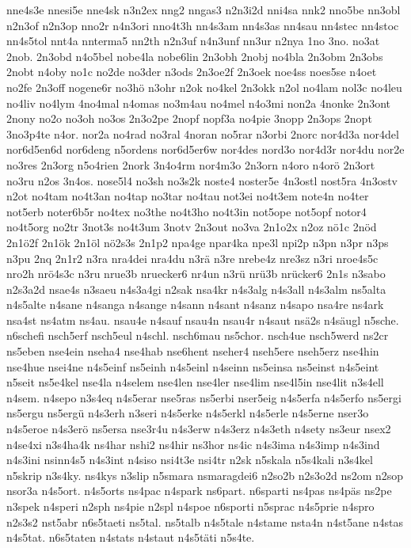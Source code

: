 {nne4s3e
nnesi5e
nne4sk
n3n2ex
nng2
nngas3
n2n3i2d
nni4sa
nnk2
nno5be
nn3obl
n2n3of
n2n3op
nno2r
n4n3ori
nno4t3h
nn4s3am
nn4s3as
nn4sau
nn4stec
nn4stoc
nn4s5tol
nnt4a
nnterma5
nn2th
n2n3uf
n4n3unf
nn3ur
n2nya
1no
3no.
no3at
2nob.
2n3obd
n4o5bel
nobe4la
nobe6lin
2n3obh
2nobj
no4bla
2n3obm
2n3obs
2nobt
n4oby
no1c
no2de
no3der
n3ods
2n3oe2f
2n3oek
noe4ss
noes5se
n4oet
no2fe
2n3off
nogene6r
no3hö
n3ohr
n2ok
no4kel
2n3okk
n2ol
no4lam
nol3c
no4leu
no4liv
no4lym
4no4mal
n4omas
no3m4au
no4mel
n4o3mi
non2a
4nonke
2n3ont
2nony
no2o
no3oh
no3os
2n3o2pe
2nopf
nopf3a
no4pie
3nopp
2n3ops
2nopt
3no3p4te
n4or.
nor2a
no4rad
no3ral
4noran
no5rar
n3orbi
2norc
nor4d3a
nor4del
nor6d5en6d
nor6deng
n5ordens
nor6d5er6w
nor4des
nord3o
nor4d3r
nor4du
nor2e
no3res
2n3org
n5o4rien
2nork
3n4o4rm
nor4m3o
2n3orn
n4oro
n4orö
2n3ort
no3ru
n2os
3n4os.
nose5l4
no3sh
no3s2k
noste4
noster5e
4n3ostl
nost5ra
4n3ostv
n2ot
no4tam
no4t3an
no4tap
no3tar
no4tau
not3ei
no4t3em
note4n
no4ter
not5erb
noter6b5r
no4tex
no3the
no4t3ho
no4t3in
not5ope
not5opf
notor4
no4t5org
no2tr
3not3s
no4t3um
3notv
2n3out
no3va
2n1o2x
n2oz
nö1c
2nöd
2n1ö2f
2n1ök
2n1öl
nö2s3s
2n1p2
npa4ge
npar4ka
npe3l
npi2p
n3pn
n3pr
n3ps
n3pu
2nq
2n1r2
n3ra
nra4dei
nra4du
n3rä
n3re
nrebe4z
nre3sz
n3ri
nroe4s5c
nro2h
nrö4s3c
n3ru
nrue3b
nruecker6
nr4un
n3rü
nrü3b
nrücker6
2n1s
n3sabo
n2s3a2d
nsae4s
n3saeu
n4s3a4gi
n2sak
nsa4kr
n4s3alg
n4s3all
n4s3alm
ns5alta
n4s5alte
n4sane
n4sanga
n4sange
n4sann
n4sant
n4sanz
n4sapo
nsa4re
ns4ark
nsa4st
ns4atm
ns4au.
nsau4e
n4sauf
nsau4n
nsau4r
n4saut
nsä2s
n4säugl
n5sche.
n6schefi
nsch5erf
nsch5eul
n4schl.
nsch6mau
ns5chor.
nsch4ue
nsch5werd
ns2cr
ns5eben
nse4ein
nseha4
nse4hab
nse6hent
nseher4
nseh5ere
nseh5erz
nse4hin
nse4hue
nsei4ne
n4s5einf
ns5einh
n4s5einl
n4seinn
ns5einsa
ns5einst
n4s5eint
n5seit
ns5e4kel
nse4la
n4selem
nse4len
nse4ler
nse4lim
nse4l5in
nse4lit
n3s4ell
n4sem.
n4sepo
n3s4eq
n4s5erar
nse5ras
ns5erbi
nser5eig
n4s5erfa
n4s5erfo
ns5ergi
ns5ergu
ns5ergü
n4s3erh
n3seri
n4s5erke
n4s5erkl
n4s5erle
n4s5erne
nser3o
n4s5eroe
n4s3erö
ns5ersa
nse3r4u
n4s3erw
n4s3erz
n4s3eth
n4sety
ns3eur
nsex2
n4se4xi
n3s4ha4k
ns4har
nshi2
ns4hir
ns3hor
ns4ic
n4s3ima
n4s3imp
n4s3ind
n4s3ini
nsinn4s5
n4s3int
n4siso
nsi4t3e
nsi4tr
n2sk
n5skala
n5s4kali
n3s4kel
n5skrip
n3s4ky.
ns4kys
n3slip
n5smara
nsmaragdei6
n2so2b
n2s3o2d
ns2om
n2sop
nsor3a
n4s5ort.
n4s5orts
ns4pac
n4spark
ns6part.
n6sparti
ns4pas
ns4päs
ns2pe
n3spek
n4speri
n2sph
ns4pie
n2spl
n4spoe
n6sporti
n5sprac
n4s5prie
n4spro
n2s3s2
nst5abr
n6s5taeti
ns5tal.
ns5talb
n4s5tale
n4stame
nsta4n
n4st5ane
n4stas
n4s5tat.
n6s5taten
n4stats
n4staut
n4s5täti
n5s4te.
}
